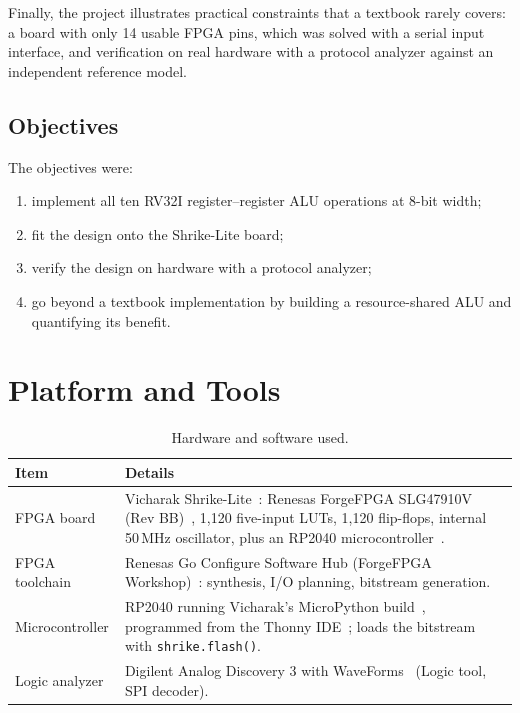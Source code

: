 \documentclass[12pt,a4paper,twoside]{article}
\begin{document}
Finally, the project illustrates practical constraints that a textbook rarely
covers: a board with only 14 usable FPGA pins, which was solved with a serial input
interface, and verification on real hardware with a protocol analyzer against an
independent reference model.

\subsection{Objectives}

The objectives were:
\begin{enumerate}
  \item implement all ten RV32I register--register ALU operations at 8-bit width;
  \item fit the design onto the Shrike-Lite board;
  \item verify the design on hardware with a protocol analyzer;
  \item go beyond a textbook implementation by building a resource-shared ALU and
        quantifying its benefit.
\end{enumerate}

\section{Platform and Tools}

\begin{table}[H]
\centering
\caption{Hardware and software used.}
\label{tab:platform}
\begin{tabularx}{\linewidth}{@{}lX@{}}
\toprule
\textbf{Item} & \textbf{Details} \\
\midrule
FPGA board & Vicharak Shrike-Lite~\cite{shrike}: Renesas ForgeFPGA SLG47910V
             (Rev BB)~\cite{slg47910}, 1,120 five-input LUTs, 1,120 flip-flops,
             internal 50\,MHz oscillator, plus an RP2040
             microcontroller~\cite{rp2040}. \\
FPGA toolchain & Renesas Go Configure Software Hub (ForgeFPGA
             Workshop)~\cite{goconfigure}: synthesis, I/O planning, bitstream
             generation. \\
Microcontroller & RP2040 running Vicharak's MicroPython build~\cite{micropython},
             programmed from the Thonny IDE~\cite{thonny}; loads the bitstream
             with \texttt{shrike.flash()}. \\
Logic analyzer & Digilent Analog Discovery 3 with WaveForms~\cite{digilent}
             (Logic tool, SPI decoder). \\
\bottomrule
\end{tabularx}
\end{table}
%
\end{document}
